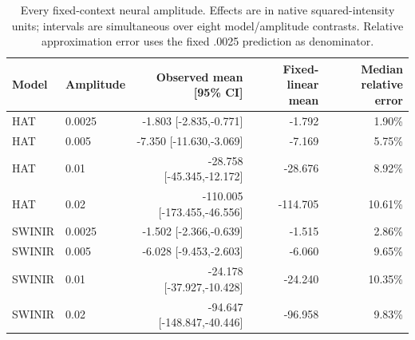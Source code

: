 \begin{table}[t]\centering\small\caption{Every fixed-context neural amplitude. Effects are in native squared-intensity units; intervals are simultaneous over eight model/amplitude contrasts. Relative approximation error uses the fixed .0025 prediction as denominator.}\begin{tabular}{llrrr}\toprule Model & Amplitude & Observed mean [95\% CI] & Fixed-linear mean & Median relative error\\\midrule
HAT & 0.0025 & -1.803 [-2.835,-0.771] & -1.792 & 1.90\% \\
HAT & 0.005 & -7.350 [-11.630,-3.069] & -7.169 & 5.75\% \\
HAT & 0.01 & -28.758 [-45.345,-12.172] & -28.676 & 8.92\% \\
HAT & 0.02 & -110.005 [-173.455,-46.556] & -114.705 & 10.61\% \\
SWINIR & 0.0025 & -1.502 [-2.366,-0.639] & -1.515 & 2.86\% \\
SWINIR & 0.005 & -6.028 [-9.453,-2.603] & -6.060 & 9.65\% \\
SWINIR & 0.01 & -24.178 [-37.927,-10.428] & -24.240 & 10.35\% \\
SWINIR & 0.02 & -94.647 [-148.847,-40.446] & -96.958 & 9.83\% \\
\bottomrule\end{tabular}\end{table}